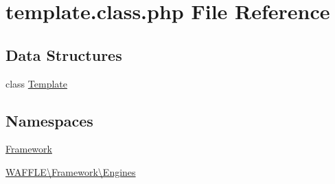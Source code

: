 \hypertarget{template_8class_8php}{}\section{template.\+class.\+php File Reference}
\label{template_8class_8php}
\subsection*{Data Structures}
\begin{DoxyCompactItemize}
\item 
class \hyperlink{class_w_a_f_f_l_e_1_1_framework_1_1_engines_1_1_template}{Template}
\end{DoxyCompactItemize}
\subsection*{Namespaces}
\begin{DoxyCompactItemize}
\item 
 \hyperlink{namespace_framework}{Framework}
\item 
 \hyperlink{namespace_w_a_f_f_l_e_1_1_framework_1_1_engines}{W\+A\+F\+F\+L\+E\textbackslash{}\+Framework\textbackslash{}\+Engines}
\end{DoxyCompactItemize}
